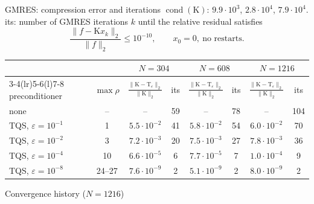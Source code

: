 \documentclass[aspectratio=169,11pt]{beamer}
\begin{document}
\begin{frame}{GMRES: compression error and iterations}
\small
$\operatorname{cond}(\mathrm{K})$: $9.9\cdot10^{3}$, $2.8\cdot10^{4}$, $7.9\cdot10^{4}$.\\[1mm]
its: number of GMRES iterations $k$ until the relative residual satisfies
\[
\frac{\|f-\mathrm{K}x_k\|_2}{\|f\|_2}\le10^{-10},\qquad x_0=0,\ \text{no restarts}.
\]
\vspace{-2mm}
\begin{center}
\begin{tabular}{@{}lccccccc@{}}
\toprule
& & \multicolumn{2}{c}{$N=304$} & \multicolumn{2}{c}{$N=608$} & \multicolumn{2}{c}{$N=1216$} \\
\cmidrule(lr){3-4}\cmidrule(lr){5-6}\cmidrule(l){7-8}
preconditioner & $\max\rho$ & $\frac{\|\mathrm{K}-\mathrm{T}_\varepsilon\|_2}{\|\mathrm{K}\|_2}$ & its & $\frac{\|\mathrm{K}-\mathrm{T}_\varepsilon\|_2}{\|\mathrm{K}\|_2}$ & its & $\frac{\|\mathrm{K}-\mathrm{T}_\varepsilon\|_2}{\|\mathrm{K}\|_2}$ & its \\
\midrule
none & -- & -- & 59 & -- & 78 & -- & 104 \\
TQS, $\varepsilon=10^{-1}$ & 1 & $5.5\cdot10^{-2}$ & 41 & $5.8\cdot10^{-2}$ & 54 & $6.0\cdot10^{-2}$ & 70 \\
TQS, $\varepsilon=10^{-2}$ & 3 & $7.2\cdot10^{-3}$ & 20 & $7.5\cdot10^{-3}$ & 27 & $7.8\cdot10^{-3}$ & 36 \\
TQS, $\varepsilon=10^{-4}$ & 10 & $6.6\cdot10^{-5}$ & 6 & $7.7\cdot10^{-5}$ & 7 & $1.0\cdot10^{-4}$ & 9 \\
TQS, $\varepsilon=10^{-8}$ & 24--27 & $7.6\cdot10^{-9}$ & 2 & $5.1\cdot10^{-9}$ & 2 & $8.0\cdot10^{-9}$ & 2 \\
\bottomrule
\end{tabular}
\end{center}
\end{frame}

\begin{frame}{Convergence history ($N=1216$)}
\centering
{}
\end{frame}
\end{document}
